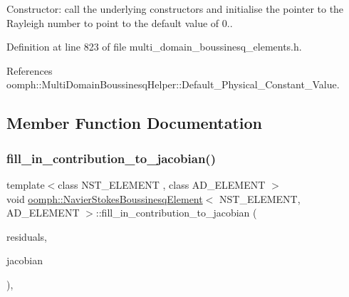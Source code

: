 Constructor\+: call the underlying constructors and initialise the pointer to the Rayleigh number to point to the default value of 0.. 



Definition at line 823 of file multi\+\_\+domain\+\_\+boussinesq\+\_\+elements.\+h.



References oomph\+::\+Multi\+Domain\+Boussinesq\+Helper\+::\+Default\+\_\+\+Physical\+\_\+\+Constant\+\_\+\+Value.



\subsection{Member Function Documentation}
\mbox{\label{classoomph_1_1NavierStokesBoussinesqElement_a01483469b070309aeb8948273b974feb}} 
\subsubsection{\texorpdfstring{fill\+\_\+in\+\_\+contribution\+\_\+to\+\_\+jacobian()}{fill\_in\_contribution\_to\_jacobian()}}
{\footnotesize\ttfamily template$<$class N\+S\+T\+\_\+\+E\+L\+E\+M\+E\+NT , class A\+D\+\_\+\+E\+L\+E\+M\+E\+NT $>$ \\
void \hyperlink{classoomph_1_1NavierStokesBoussinesqElement}{oomph\+::\+Navier\+Stokes\+Boussinesq\+Element}$<$ N\+S\+T\+\_\+\+E\+L\+E\+M\+E\+NT, A\+D\+\_\+\+E\+L\+E\+M\+E\+NT $>$\+::fill\+\_\+in\+\_\+contribution\+\_\+to\+\_\+jacobian (\begin{DoxyParamCaption}\item[{\hyperlink{classoomph_1_1Vector}{Vector}$<$ double $>$ \&}]{residuals,  }\item[{\hyperlink{classoomph_1_1DenseMatrix}{Dense\+Matrix}$<$ double $>$ \&}]{jacobian }\end{DoxyParamCaption})\hspace{0.3cm}{\ttfamily [inline]}, {\ttfamily [virtual]}}



